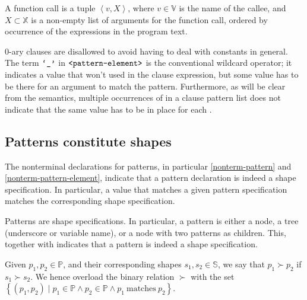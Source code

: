 \begin{definition}\label{definition:function-call} A function call is a tuple
$\left\langle v, X \right\rangle$, where $v\in\mathbb{V}$ is the name of the
callee, and $X\subset\mathbb{X}$ is a non-empty list of arguments for the
function call, ordered by occurrence of the expressions in the program
text.\end{definition}

0-ary clauses are disallowed to avoid having to deal with constants in general.
The term $\text{{\ttfamily`\_'}}$ in $\text{{\ttfamily<pattern-element>}}$ is the conventional
wildcard operator; it indicates a value that won't used in the clause
expression, but some value has to be there for an argument to match the
pattern. Furthermore, as will be clear from the semantics, multiple occurrences
of \term{\_} in a clause pattern list does not indicate that the same value has
to be in place for each \term{\_}. 



\subsection{Patterns constitute shapes}

The nonterminal declarations for patterns, in particular \ref{nonterm-pattern}
and \ref{nonterm-pattern-element}, indicate that a pattern declaration is
indeed a shape specification. In particular, a value that matches a given
pattern specification matches the corresponding shape specification.

\begin{corollary} Patterns are shape specifications. In particular, a pattern
is either a node, a tree (underscore or variable name), or a node with two
patterns as children. This, together with  indicates
that a pattern is indeed a shape specification.\end{corollary}

\begin{definition} Given $p_1,p_2\in\mathbb{P}$, and their corresponding shapes
$s_1,s_2\in\mathbb{S}$, we say that $p_1\succ p_2$ if $s_1\succ s_2$. We hence
overload the binary relation $\succ$ with the set $\left\{(p_1,p_2)\mid
p_1\in\mathbb{P} \wedge p_2\in\mathbb{P} \wedge p_1\ \text{matches}\
p_2\right\}$.\end{definition}

